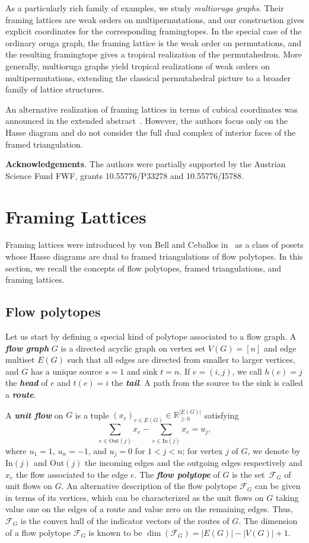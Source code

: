 \documentclass[12pt, reqno]{amsart}
\newcommand{\defn}[1]{{\color{blue!50!black}\textbf{\emph{#1}}}}
\theoremstyle{plain}
\theoremstyle{definition}
\numberwithin{equation}{section}
\newcommand\bbR{\mathbb{R}}
\newcommand\calF{\mathcal{F}}
\newcommand\In{\mathrm{In}}
\newcommand\Out{\mathrm{Out}}
\begin{document}
As a particularly rich family of examples, we study \emph{multioruga graphs}. Their framing lattices are weak orders on multipermutations, and our construction gives explicit coordinates for the corresponding framingtopes. In the special case of the ordinary oruga graph, the framing lattice is the weak order on permutations, and the resulting framingtope gives a tropical realization of the permutahedron. More generally, multioruga graphs yield tropical realizations of weak orders on multipermutations, extending the classical permutahedral picture to a broader family of lattice structures.

An alternative realization of framing lattices in terms of cubical coordinates was announced in the extended abstract~\cite{berggren_canonical_2026}. However, the authors focus only on the Hasse diagram and do not consider the full dual complex of interior faces of the framed triangulation.

\textbf{Acknowledgements}. The authors were partially supported by the Austrian Science Fund FWF, grants 10.55776/P33278 and 10.55776/I5788.

\section{Framing Lattices}\label{section: framinglat}
Framing lattices were introduced by von Bell and Ceballos in~\cite{vonBell_framing_2024} as a class of posets whose Hasse diagrams are dual to framed triangulations of flow polytopes. In this section, we recall the concepts of flow polytopes, framed triangulations, and framing lattices.


\subsection{Flow polytopes}
Let us start by defining a special kind of polytope associated to a flow graph. A \defn{flow graph} $G$ is a directed acyclic graph on vertex set $V(G) = [n]$ and edge multiset $E(G)$ such that all edges are directed from smaller to larger vertices, and $G$ has a unique source $s=1$ and sink $t=n$. If $e=(i,j)$, we call $h(e)=j$ the \defn{head} of $e$ and $t(e)=i$ the \defn{tail}. A path from the source to the sink is called a \defn{route}.

A \defn{unit flow} on $G$ is a tuple $(x_e)_{e\in E(G)} \in \bbR^{|E(G)|}_{\geq0}$ satisfying
$$\sum_{e \in \Out(j)} x_e - \sum_{e \in \In(j)}  x_e = u_j,$$
where $u_1 = 1$, $u_n = -1$, and $u_j = 0$ for $1 < j < n$; for vertex $j$ of $G$, we denote by $\In(j)$ and $\Out(j)$ the incoming edges and the outgoing edges respectively and $x_e$ the flow associated to the edge $e$. The \defn{flow polytope} of $G$ is the set~$\calF_G$ of unit flows on $G$. An alternative description of the flow polytope $\calF_G$ can be given in terms of its vertices, which can be characterized as the unit flows on $G$ taking value one on the edges of a route and value zero on the remaining edges. Thus,~$\calF_G$ is the convex hull of the indicator vectors of the routes of $G$. The dimension of a flow polytope $\calF_{G}$ is known to be $\dim(\calF_G)=|E(G)| - |V(G)| +1$.
\end{document}
